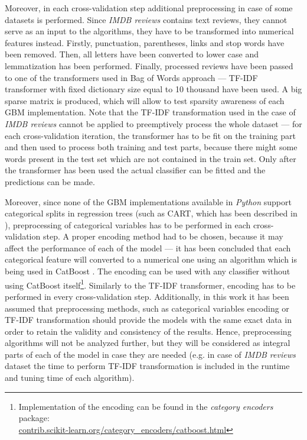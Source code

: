 \documentclass[magisterska, english]{pwr_wmat_praca_dyplomowa}
\theoremstyle{plain}
\numberwithin{theorem}{chapter}
\theoremstyle{definition}
\numberwithin{theorem}{chapter}
\begin{document}
Moreover, in each cross-validation step additional preprocessing in case of some datasets is performed. Since \emph{IMDB reviews} contains text reviews, they cannot serve as an input to the algorithms, they have to be transformed into numerical features instead. Firstly, punctuation, parentheses, links and stop words have been removed. Then, all letters have been converted to lower case and lemmatization has been performed. Finally, processed reviews have been passed to one of the transformers used in Bag of Words approach --- TF-IDF transformer \cite{sklearn} with fixed dictionary size equal to 10 thousand have been used. A big sparse matrix is produced, which will allow to test sparsity awareness of each GBM implementation.
Note that the TF-IDF transformation used in the case of \emph{IMDB reviews} cannot be applied to preemptively process the whole dataset --- for each cross-validation iteration, the transformer has to be fit on the training part and then used to process both training and test parts, because there might some words present in the test set which are not contained in the train set. Only after the transformer has been used the actual classifier can be fitted and the predictions can be made.

Moreover, since none of the GBM implementations available in \emph{Python} support categorical splits in regression trees (such as CART, which has been described in \cite{esl}), preprocessing of categorical variables has to be performed in each cross-validation step. A proper encoding method had to be chosen, because it may affect the performance of each of the model --- it has been concluded that each categorical feature will converted to a numerical one using an algorithm which is being used in CatBoost \cite{catboost}. The encoding can be used with any classifier without using CatBoost itself\footnote{Implementation of the encoding can be found in the \emph{category encoders} package:\\\indent \url{contrib.scikit-learn.org/category_encoders/catboost.html}}. Similarly to the TF-IDF transformer, encoding has to be performed in every cross-validation step. Additionally, in this work it has been assumed that preprocessing methods, such as categorical variables encoding or TF-IDF transformation should provide the models with the same exact data in order to retain the validity and consistency of the results. Hence, preprocessing algorithms will not be analyzed further, but they will be considered as integral parts of each of the model in case they are needed (e.g. in case of \emph{IMDB reviews} dataset the time to perform TF-IDF transformation is included in the runtime and tuning time of each algorithm).
\end{document}
